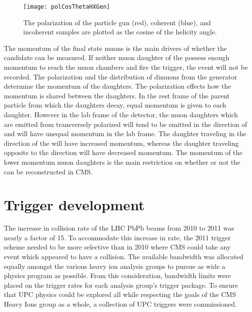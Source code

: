    \begin{figure}[!Hhbt]
      \centering
      \texttt{[image: polCosThetaHXGen]}
      \caption{ The \JPsi{} polarization of the particle gun (red),
        coherent (blue), and incoherent samples are plotted as the
        cosine of the helicity angle.} 
      \label{fig:genHXAngle}
    \end{figure}
    The momentum of the final state muons is the main drivers of whether the 
      candidate can be measured.
    If neither muon daughter of the \JPsi{} possess enough momentum to reach 
      the muon chambers and fire the trigger, the event will not be recorded.
    The polarization and the \pt{} distribution of dimuons from the generator
      determine the momentum of the daughters. 
    The polarization effects how the momentum is shared between the daughters.
    In the rest frame of the parent particle from which the daughters decay,
      equal momentum is given to each daughter. 
    However in the lab frame of the detector, the muon daughters which are 
      emitted from transversely polarized \JPsi{} will tend to be emitted in
      the direction of \JPsi{} and will have unequal momentum in the lab 
      frame.
    The daughter traveling in the direction of the \JPsi{} will have increased
      momentum, whereas the daughter traveling opposite to the \JPsi{} 
      direction will have decreased momentum. 
    The momentum of the lower momentum muon daughters is the main restriction
      on whether or not the \JPsi{} can be reconstructed in CMS. 
    
  \section{\label{sec:TrigDev} Trigger development} 
    The increase in collision rate of the LHC PbPb beams from 2010 to 2011 was
      nearly a factor of 15. 
    To accommodate this increase in rate, the 2011 trigger scheme needed to be 
      more selective than in 2010 where CMS could take any event which 
      appeared to have a collision.
    The available bandwidth was allocated equally amongst the various heavy ion
      analysis groups to pursue as wide a physics program as possible.
    From this consideration, bandwidth limits were placed on the trigger rates
      for each analysis group's trigger package. 
    To ensure that UPC physics could be explored all while respecting the
      goals of the CMS Heavy Ions group as a whole, a collection of UPC triggers
      were commissioned. 
  
